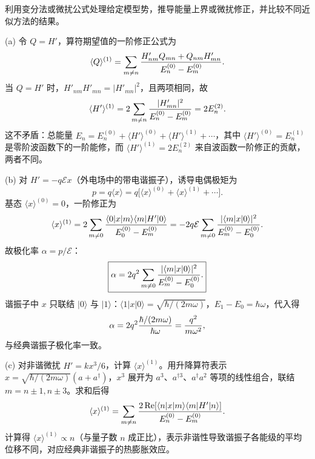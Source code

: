 \begin{question}
利用变分法或微扰公式处理给定模型势，推导能量上界或微扰修正，并比较不同近似方法的结果。
\end{question}
\begin{solution}
(a) 令 $Q=H'$，算符期望值的一阶修正公式为
\[
\langle Q\rangle^{(1)} = \sum_{m\ne n} {H'_{nm} Q_{mn} + Q_{nm} H'_{mn}\over E_n^{(0)}-E_m^{(0)}}.
\]
当 $Q=H'$ 时，$H'_{nm} H'_{mn}=|H'_{mn}|^2$，且两项相同，故
\[
\langle H'\rangle^{(1)} = 2\sum_{m\ne n}{|H'_{mn}|^2\over E_n^{(0)}-E_m^{(0)}} = 2E_n^{(2)}.
\]
这不矛盾：总能量 $E_n = E_n^{(0)} + \langle H'\rangle^{(0)} + \langle H'\rangle^{(1)} + \cdots$，其中 $\langle H'\rangle^{(0)}=E_n^{(1)}$ 是零阶波函数下的一阶能修，而 $\langle H'\rangle^{(1)}=2E_n^{(2)}$ 来自波函数一阶修正的贡献，两者不同。

(b) 对 $H'=-q\mathcal Ex$（外电场中的带电谐振子），诱导电偶极矩为
\[
p = q\langle x\rangle = q\bigl[\langle x\rangle^{(0)} + \langle x\rangle^{(1)} + \cdots\bigr].
\]
基态 $\langle x\rangle^{(0)}=0$，一阶修正为
\[
\langle x\rangle^{(1)} = 2\sum_{m\ne 0} {\langle0|x|m\rangle\langle m|H'|0\rangle\over E_0^{(0)}-E_m^{(0)}}
= -2q\mathcal E\sum_{m\ne0}{|\langle m|x|0\rangle|^2\over E_m^{(0)}-E_0^{(0)}}.
\]
故极化率 $\alpha = p/\mathcal E$：
\[
\boxed{\alpha = 2q^2\sum_{m\ne0}{|\langle m|x|0\rangle|^2\over E_m^{(0)}-E_0^{(0)}}.}
\]
谐振子中 $x$ 只联结 $|0\rangle$ 与 $|1\rangle$：$\langle1|x|0\rangle = \sqrt{\hbar/(2m\omega)}$，$E_1-E_0=\hbar\omega$，代入得
\[
\alpha = 2q^2{\hbar/(2m\omega)\over\hbar\omega} = {q^2\over m\omega^2},
\]
与经典谐振子极化率一致。

(c) 对非谐微扰 $H' = kx^3/6$，计算 $\langle x\rangle^{(1)}$。用升降算符表示 $x=\sqrt{\hbar/(2m\omega)}(a+a^\dagger)$，$x^3$ 展开为 $a^3$、$a^{\dagger3}$、$a^\dagger a^2$ 等项的线性组合，联结 $m=n\pm1,n\pm3$。求和后得
\[
\langle x\rangle^{(1)} = \sum_{m\ne n} {2\,\mathrm{Re}[\langle n|x|m\rangle\langle m|H'|n\rangle]\over E_n^{(0)}-E_m^{(0)}}.
\]
计算得 $\langle x\rangle^{(1)} \propto n$（与量子数 $n$ 成正比），表示非谐性导致谐振子各能级的平均位移不同，对应经典非谐振子的热膨胀效应。
\end{solution}

